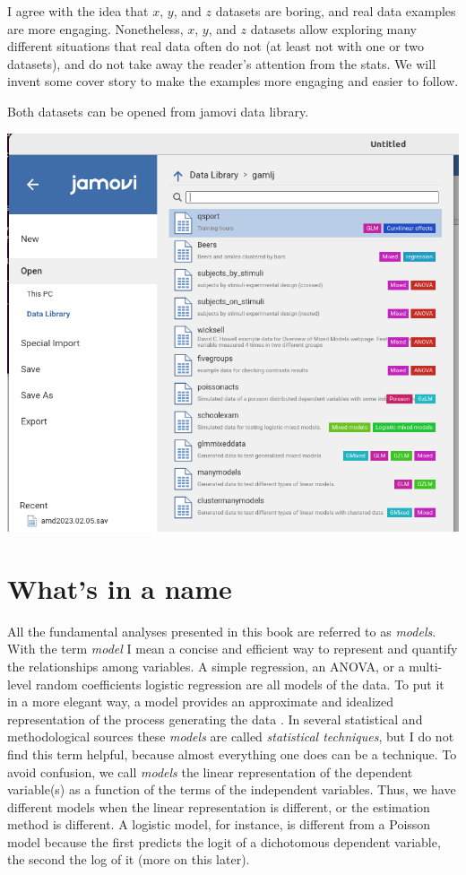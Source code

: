 \documentclass[
]{book}
\begin{document}
I agree with the idea that \(x\), \(y\), and \(z\) datasets are boring, and real data examples are more engaging. Nonetheless, \(x\), \(y\), and \(z\) datasets allow exploring many different situations that real data often do not (at least not with one or two datasets), and do not take away the reader's attention from the stats. We will invent some cover story to make the examples more engaging and easier to follow.

Both datasets can be opened from {jamovi} data library.

\includegraphics[width=0.9\linewidth]{bookletpics/0_datalibrary1}

\hypertarget{naming}{%
\section{What's in a name}\label{naming}}

All the fundamental analyses presented in this book are referred to as \emph{models}. With the term \emph{model} I mean a concise and efficient way to represent and quantify the relationships among variables. A simple regression, an ANOVA, or a multi-level random coefficients logistic regression are all models of the data. To put it in a more elegant way, a model provides an approximate and idealized representation of the process generating the data \citep{neyman1957inductive}. In several statistical and methodological sources these \emph{models} are called \emph{statistical techniques}, but I do not find this term helpful, because almost everything one does can be a technique. To avoid confusion, we call \emph{models} the linear representation of the dependent variable(s) as a function of the terms of the independent variables. Thus, we have different models when the linear representation is different, or the estimation method is different. A logistic model, for instance, is different from a Poisson model because the first predicts the logit of a dichotomous dependent variable, the second the log of it (more on this later).
\end{document}

